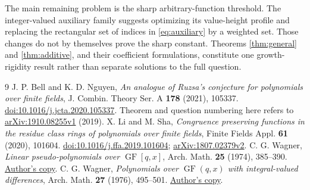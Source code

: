 \documentclass[11pt]{article}
\begin{document}
The main remaining problem is the sharp arbitrary-function threshold.
The integer-valued auxiliary family suggests optimizing its value-height
profile and replacing the rectangular set of indices in
\eqref{eq:auxiliary} by a weighted set. Those changes do not by themselves
prove the sharp constant. Theorems \ref{thm:general} and
\ref{thm:additive}, and their coefficient formulations, constitute one
growth-rigidity result rather than separate solutions to the full question.

\begin{thebibliography}{9}
J. P. Bell and K. D. Nguyen,
\emph{An analogue of Ruzsa's conjecture for polynomials over finite fields},
J. Combin. Theory Ser. A \textbf{178} (2021), 105337.
\href{https://doi.org/10.1016/j.jcta.2020.105337}{doi:10.1016/j.jcta.2020.105337}.
Theorem and question numbering here refers to
\href{https://arxiv.org/abs/1910.08255v1}{arXiv:1910.08255v1} (2019).
X. Li and M. Sha,
\emph{Congruence preserving functions in the residue class rings of
polynomials over finite fields},
Finite Fields Appl. \textbf{61} (2020), 101604.
\href{https://doi.org/10.1016/j.ffa.2019.101604}{doi:10.1016/j.ffa.2019.101604};
\href{https://arxiv.org/abs/1807.02379v2}{arXiv:1807.02379v2}.
C. G. Wagner, \emph{Linear pseudo-polynomials over $\operatorname{GF}[q,x]$},
Arch. Math. \textbf{25} (1974), 385--390.
\href{https://web.math.utk.edu/~cwagner/papers/pseudo.pdf}{Author's copy}.
C. G. Wagner, \emph{Polynomials over $\operatorname{GF}(q,x)$ with
integral-valued differences}, Arch. Math. \textbf{27} (1976), 495--501.
\href{https://web.math.utk.edu/~cwagner/papers/gfqx.pdf}{Author's copy}.
\end{thebibliography}
\end{document}

